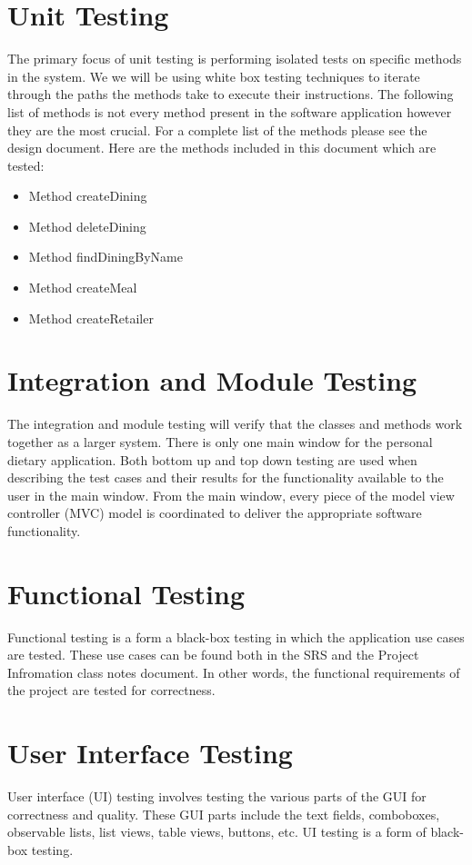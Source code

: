 \documentclass{scrreprt}
\begin{document}
    \section{Unit Testing}
    The primary focus of unit testing is performing isolated tests on specific methods in the system. We we will be using white box testing techniques to iterate through the paths the methods take to execute their instructions. The following list of methods is not every method present in the software application however they are the most crucial. For a complete list of the methods please see the design document. Here are the methods included in this document which are tested: \\
    \begin{itemize}
    \item Method createDining
    \item Method deleteDining
    \item Method findDiningByName
    \item Method createMeal
    \item Method createRetailer
    \end{itemize}

    \section{Integration and Module Testing}
    
    The integration and module testing will verify that the classes and methods work together as a larger system. There is only one main window for the personal dietary application. Both bottom up and top down testing are used when describing the test cases and their results for the functionality available to the user in the main window. From the main window, every piece of the model view controller (MVC) model is coordinated to deliver the appropriate software functionality.

    \section{Functional Testing}
    Functional testing is a form a black-box testing in which the application use cases are tested. These use cases can be found both in the SRS and the Project Infromation class notes document. In other words, the functional requirements of the project are tested for correctness.

    \section{User Interface Testing}
    User interface (UI) testing involves testing the various parts of the GUI for correctness and quality. These GUI parts include the text fields, comboboxes, observable lists, list views, table views, buttons, etc. UI testing is a form of black-box testing.
\end{document}
